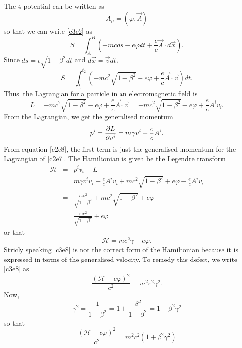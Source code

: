 \begin{enumerate}
The 4-potential can be written as 
\begin{equation}\label{c3e3}
A_\mu = (\varphi, \vec{A})
\end{equation}
so that we can write \eqref{c3e2} as
\begin{equation}\label{c3e4}
S = \int_A^B\left(-mcds - e\varphi dt + 
\frac{e}{c}\vec{A}\cdot d\vec{x}\right).
\end{equation}
Since $ds = c\sqrt{1 - \beta^2}dt$ and $d\vec{x} = \vec{v}dt$,
\begin{equation}\label{c3e5}
S = \int_{t_1}^{t_2}\left(-mc^2\sqrt{1 - \beta^2} - e\varphi + 
\frac{e}{c}\vec{A}\cdot\vec{v}\right)dt.
\end{equation}
Thus, the Lagrangian for a particle in an electromagnetic field is
\begin{equation}\label{c3e6}
L = -mc^2\sqrt{1 - \beta^2} - e\varphi + \frac{e}{c}\vec{A}\cdot\vec{v}
= -mc^2\sqrt{1 - \beta^2} - e\varphi + \frac{e}{c}A^i v_i.
\end{equation}
From the Lagrangian, we get the generalised momentum
\begin{equation}\label{c3e7}
p^i = \frac{\partial{L}}{\partial{v^i}} = m\gamma v^i + \frac{e}{c}A^i.
\end{equation}
From equation \eqref{c2e8}, the first term is just the generalised momentum for
the Lagrangian of \eqref{c2e7}. The Hamiltonian is given be the Legendre
transform
\begin{eqnarray*}
\mathcal{H} &=& p^iv_i - L \\
  &=& m\gamma v^iv_i + \frac{e}{c}A^iv_i + mc^2\sqrt{1 - \beta^2} + e\varphi - 
  \frac{e}{c}A^iv_i \\
  &=& \frac{mv^2}{\sqrt{1 - \beta^2}} + mc^2\sqrt{1 - \beta^2} + e\varphi \\
  &=& \frac{mc^2}{\sqrt{1 - \beta^2}} + e\varphi
\end{eqnarray*}
or that
\begin{equation}\label{c3e8}
\mathcal{H} = mc^2\gamma + e\varphi.
\end{equation}
Stricly speaking \eqref{c3e8} is not the correct form of the Hamiltonian because 
it is expressed in terms of the generalised velocity. To remedy this defect, we 
write
\eqref{c3e8} as
\[
\frac{(\mathcal{H} - e\varphi)^2}{c^2} = m^2c^2 \gamma^2.
\]
Now,
\begin{equation}\label{c3e9}
\gamma^2 = \frac{1}{1 - \beta^2} = 1 + \frac{\beta^2}{1 - \beta^2} = 
1 + \beta^2\gamma^2
\end{equation}
so that
\[
\frac{(\mathcal{H} - e\varphi)^2}{c^2} = m^2c^2(1 + \beta^2\gamma^2) 
\]
\end{enumerate}

